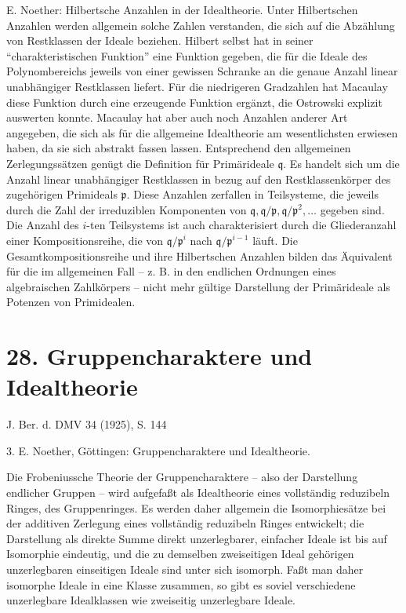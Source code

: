 \documentclass[11pt]{article}
\begin{document}
E. Noether: Hilbertsche Anzahlen in der Idealtheorie. Unter Hilbertschen Anzahlen werden allgemein solche Zahlen verstanden, die sich auf die Abzählung von Restklassen der Ideale beziehen. Hilbert selbst hat in seiner ``charakteristischen Funktion'' eine Funktion gegeben, die für die Ideale des Polynombereichs jeweils von einer gewissen Schranke an die genaue Anzahl linear unabhängiger Restklassen liefert. Für die niedrigeren Gradzahlen hat Macaulay diese Funktion durch eine erzeugende Funktion ergänzt, die Ostrowski explizit auswerten konnte. Macaulay hat aber auch noch Anzahlen anderer Art angegeben, die sich als für die allgemeine Idealtheorie am wesentlichsten erwiesen haben, da sie sich abstrakt fassen lassen. Entsprechend den allgemeinen Zerlegungssätzen genügt die Definition für Primärideale $\mathfrak q$. Es handelt sich um die Anzahl linear unabhängiger Restklassen in bezug auf den Restklassenkörper des zugehörigen Primideals $\mathfrak p$. Diese Anzahlen zerfallen in Teilsysteme, die jeweils durch die Zahl der irreduziblen Komponenten von $\mathfrak q,\mathfrak q/\mathfrak p,\mathfrak q/\mathfrak p^2,\ldots$ gegeben sind. Die Anzahl des $i$-ten Teilsystems ist auch charakterisiert durch die Gliederanzahl einer Kompositionsreihe, die von $\mathfrak q/\mathfrak p^i$ nach $\mathfrak q/\mathfrak p^{i-1}$ läuft. Die Gesamtkompositionsreihe und ihre Hilbertschen Anzahlen bilden das Äquivalent für die im allgemeinen Fall -- z. B. in den endlichen Ordnungen eines algebraischen Zahlkörpers -- nicht mehr gültige Darstellung der Primärideale als Potenzen von Primidealen.

\section*{28. Gruppencharaktere und Idealtheorie}

\begin{center}
J. Ber. d. DMV 34 (1925), S. 144
\end{center}

3. E. Noether, Göttingen: Gruppencharaktere und Idealtheorie.

Die Frobeniussche Theorie der Gruppencharaktere -- also der Darstellung endlicher Gruppen -- wird aufgefaßt als Idealtheorie eines vollständig reduzibeln Ringes, des Gruppenringes. Es werden daher allgemein die Isomorphiesätze bei der additiven Zerlegung eines vollständig reduzibeln Ringes entwickelt; die Darstellung als direkte Summe direkt unzerlegbarer, einfacher Ideale ist bis auf Isomorphie eindeutig, und die zu demselben zweiseitigen Ideal gehörigen unzerlegbaren einseitigen Ideale sind unter sich isomorph. Faßt man daher isomorphe Ideale in eine Klasse zusammen, so gibt es soviel verschiedene unzerlegbare Idealklassen wie zweiseitig unzerlegbare Ideale.
\end{document}
